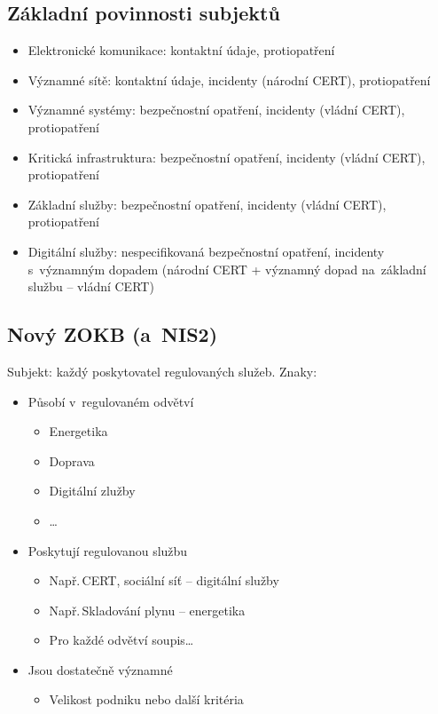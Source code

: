 \subsection{Základní povinnosti subjektů}
\begin{itemize}
    \item Elektronické komunikace: kontaktní údaje, protiopatření
    \item Významné sítě: kontaktní údaje, incidenty (národní CERT), protiopatření
    \item Významné systémy: bezpečnostní opatření, incidenty (vládní CERT), protiopatření
    \item Kritická infrastruktura: bezpečnostní opatření, incidenty (vládní CERT), protiopatření
    \item Základní služby: bezpečnostní opatření, incidenty (vládní CERT), protiopatření
    \item Digitální služby: nespecifikovaná bezpečnostní opatření, incidenty s~významným dopadem (národní CERT + významný dopad na~základní službu -- vládní CERT)
\end{itemize}

\subsection{Nový ZOKB (a~NIS2)}
Subjekt: každý poskytovatel regulovaných služeb. Znaky:
\begin{itemize}
    \item Působí v~regulovaném odvětví
    \begin{itemize}
        \item Energetika
        \item Doprava
        \item Digitální zlužby
        \item \dots
    \end{itemize}
    \item Poskytují regulovanou službu
    \begin{itemize}
        \item Např.\,CERT, sociální síť -- digitální služby
        \item Např.\,Skladování plynu -- energetika
        \item Pro každé odvětví soupis\dots
    \end{itemize}
    \item Jsou dostatečně významné
    \begin{itemize}
        \item Velikost podniku nebo další kritéria
    \end{itemize}
\end{itemize}

